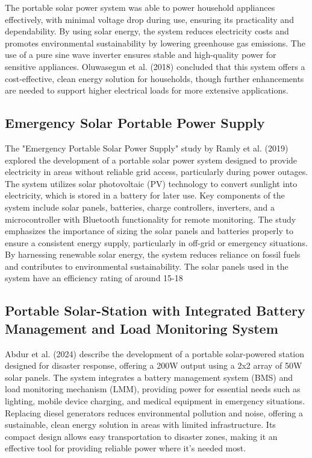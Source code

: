 {The portable solar power system was able to power household appliances effectively, with minimal voltage drop during use, ensuring its practicality and dependability. By using solar energy, the system reduces electricity costs and promotes environmental sustainability by lowering greenhouse gas emissions. The use of a pure sine wave inverter ensures stable and high-quality power for sensitive appliances. Oluwasegun et al. (2018) concluded that this system offers a cost-effective, clean energy solution for households, though further enhancements are needed to support higher electrical loads for more extensive applications.

\subsection{Emergency Solar Portable Power Supply}

The "Emergency Portable Solar Power Supply" study by Ramly et al. (2019) explored the development of a portable solar power system designed to provide electricity in areas without reliable grid access, particularly during power outages. The system utilizes solar photovoltaic (PV) technology to convert sunlight into electricity, which is stored in a battery for later use. Key components of the system include solar panels, batteries, charge controllers, inverters, and a microcontroller with Bluetooth functionality for remote monitoring. The study emphasizes the importance of sizing the solar panels and batteries properly to ensure a consistent energy supply, particularly in off-grid or emergency situations. By harnessing renewable solar energy, the system reduces reliance on fossil fuels and contributes to environmental sustainability. The solar panels used in the system have an efficiency rating of around 15-18%

\subsection{Portable Solar-Station with Integrated Battery Management and Load Monitoring System}

Abdur et al. (2024) describe the development of a portable solar-powered station designed for disaster response, offering a 200W output using a 2x2 array of 50W solar panels. The system integrates a battery management system (BMS) and load monitoring mechanism (LMM), providing power for essential needs such as lighting, mobile device charging, and medical equipment in emergency situations. Replacing diesel generators reduces environmental pollution and noise, offering a sustainable, clean energy solution in areas with limited infrastructure. Its compact design allows easy transportation to disaster zones, making it an effective tool for providing reliable power where it’s needed most.

}
